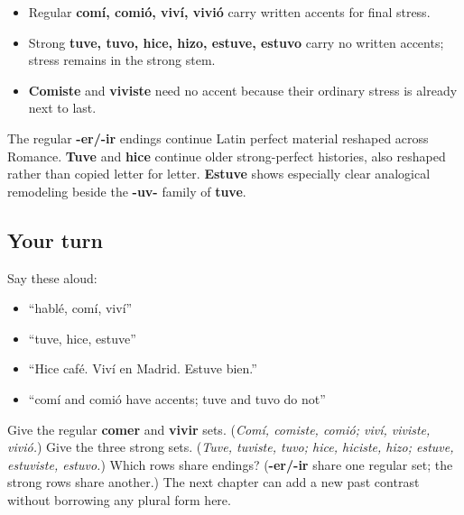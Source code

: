 \begin{grammarlens}[title={Grammar Lens: let spelling show the stress}]
\begin{itemize}
\raggedright
  \item Regular \textbf{comí, comió, viví, vivió} carry written accents for final stress.
  \item Strong \textbf{tuve, tuvo, hice, hizo, estuve, estuvo} carry no written accents; stress remains in the strong stem.
  \item \textbf{Comiste} and \textbf{viviste} need no accent because their ordinary stress is already next to last.
\end{itemize}
\end{grammarlens}

\begin{cousinweb}
The regular \textbf{-er/-ir} endings continue Latin perfect material reshaped across Romance. \textbf{Tuve} and \textbf{hice} continue older strong-perfect histories, also reshaped rather than copied letter for letter. \textbf{Estuve} shows especially clear analogical remodeling beside the \textbf{-uv-} family of \textbf{tuve}.
\end{cousinweb}

\subsection*{Your turn}
Say these aloud:

\begin{itemize}
\raggedright
  \item “hablé, comí, viví”
  \item “tuve, hice, estuve”
  \item “Hice café. Viví en Madrid. Estuve bien.”
  \item “comí and comió have accents; tuve and tuvo do not”
\end{itemize}

\begin{tcolorbox}[breakable,colback=teal!4,colframe=teal!35!black,title={Before you move on}]
Give the regular \textbf{comer} and \textbf{vivir} sets. (\emph{Comí, comiste, comió; viví, viviste, vivió.}) Give the three strong sets. (\emph{Tuve, tuviste, tuvo; hice, hiciste, hizo; estuve, estuviste, estuvo.}) Which rows share endings? (\textbf{-er/-ir} share one regular set; the strong rows share another.) The next chapter can add a new past contrast without borrowing any plural form here.
\end{tcolorbox}
